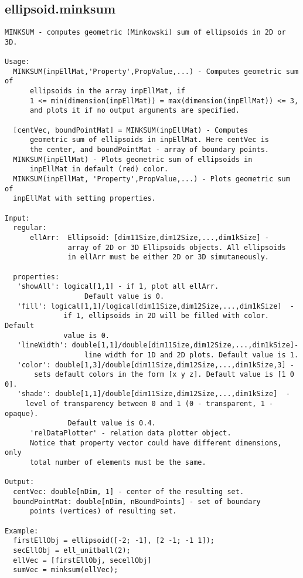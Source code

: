\subsection{\texorpdfstring{ellipsoid.minksum}{minksum}}\label{method:ellipsoid.minksum}
\begin{verbatim}
MINKSUM - computes geometric (Minkowski) sum of ellipsoids in 2D or 3D.

Usage:
  MINKSUM(inpEllMat,'Property',PropValue,...) - Computes geometric sum of
      ellipsoids in the array inpEllMat, if
      1 <= min(dimension(inpEllMat)) = max(dimension(inpEllMat)) <= 3,
      and plots it if no output arguments are specified.

  [centVec, boundPointMat] = MINKSUM(inpEllMat) - Computes
      geometric sum of ellipsoids in inpEllMat. Here centVec is
      the center, and boundPointMat - array of boundary points.
  MINKSUM(inpEllMat) - Plots geometric sum of ellipsoids in
      inpEllMat in default (red) color.
  MINKSUM(inpEllMat, 'Property',PropValue,...) - Plots geometric sum of
  inpEllMat with setting properties.

Input:
  regular:
      ellArr:  Ellipsoid: [dim11Size,dim12Size,...,dim1kSize] -
               array of 2D or 3D Ellipsoids objects. All ellipsoids
               in ellArr must be either 2D or 3D simutaneously.

  properties:
   'showAll': logical[1,1] - if 1, plot all ellArr.
                   Default value is 0.
   'fill': logical[1,1]/logical[dim11Size,dim12Size,...,dim1kSize]  -
              if 1, ellipsoids in 2D will be filled with color. Default
              value is 0.
   'lineWidth': double[1,1]/double[dim11Size,dim12Size,...,dim1kSize]-
                   line width for 1D and 2D plots. Default value is 1.
   'color': double[1,3]/double[dim11Size,dim12Size,...,dim1kSize,3] -
       sets default colors in the form [x y z]. Default value is [1 0 0].
   'shade': double[1,1]/double[dim11Size,dim12Size,...,dim1kSize]  -
     level of transparency between 0 and 1 (0 - transparent, 1 - opaque).
               Default value is 0.4.
      'relDataPlotter' - relation data plotter object.
      Notice that property vector could have different dimensions, only
      total number of elements must be the same.

Output:
  centVec: double[nDim, 1] - center of the resulting set.
  boundPointMat: double[nDim, nBoundPoints] - set of boundary
      points (vertices) of resulting set.

Example:
  firstEllObj = ellipsoid([-2; -1], [2 -1; -1 1]);
  secEllObj = ell_unitball(2);
  ellVec = [firstEllObj, secellObj]
  sumVec = minksum(ellVec);
\end{verbatim}

